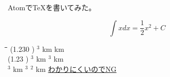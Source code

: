 \documentclass[dvipdfmx,uplatex]{jsarticle}
\title{}
\author{}
\date{\today}
\begin{document}
\maketitle
\setcounter{tocdepth}{3}
\tableofcontents
\listoffigures
\listoftables


AtomでTeXを書いてみた。

\begin{equation}
  \int x dx = \frac{1}{2}x^2 + C
\end{equation}

            \begin{tabbing}
                \hspace{10mm}\= \hspace{5 mm}\= \hspace{60 mm}\= \hspace{5 mm}\= \kill
                \>\bigcirc\>(1.230 ) $^3$ km 
                \>\bigcirc{}  km\\
                \>\times\>(1.23 ) $^3$ km 
                \>\times{} $^3$ km	\\       
                \>\triangle{} $^3$ km 
                \>\triangle{}$^3$ $^2$ km \hspace{2 mm} \uline{わかりにくいのでNG} \\ 
            \end{tabbing}
\end{document}
